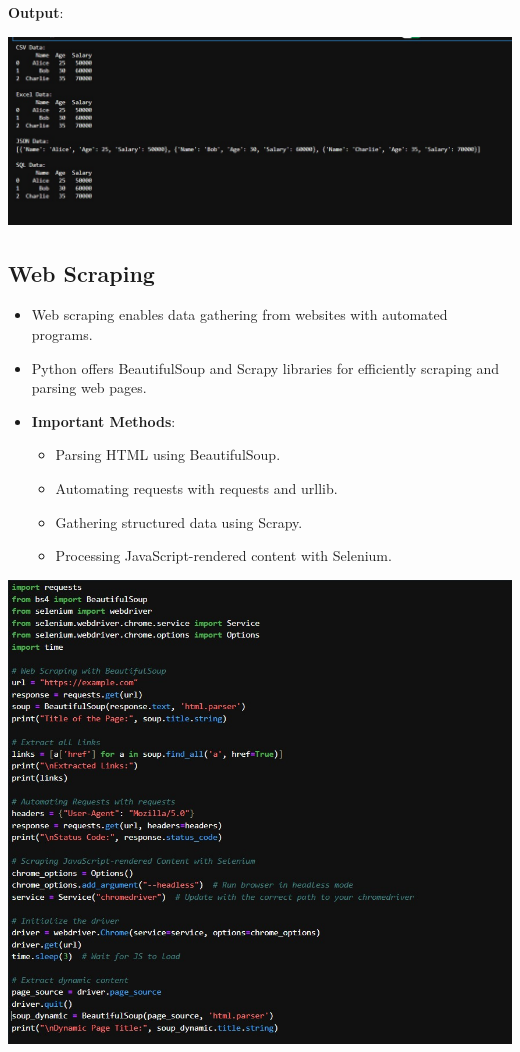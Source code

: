 \documentclass{article}
\begin{document}
\textbf{Output}:

\includegraphics[width=14cm,height=6.5
cm]{Reading&Writing_Output.jpeg}
\subsection {Web Scraping}
\begin{itemize}
    \item Web scraping enables data gathering from websites with automated programs.
    \item Python offers BeautifulSoup and Scrapy libraries for efficiently scraping and parsing web pages.
    \item \textbf{Important Methods}:
    \begin{itemize}
    \item Parsing HTML using BeautifulSoup.
    \item Automating requests with requests and urllib.
    \item Gathering structured data using Scrapy.
    \item Processing JavaScript-rendered content with Selenium.
    \end{itemize}
\end{itemize}

\includegraphics[width=14cm,height=12
cm]{WebScraping.jpeg}
\end{document}
